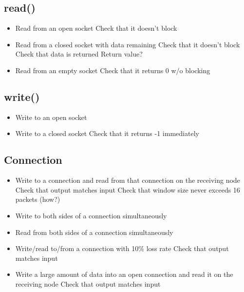 \documentclass[]{article}
\begin{document}
\subsection{read()}
\begin{itemize}
	\item Read from an open socket
	\subitem Check that it doesn't block
	\item Read from a closed socket with data remaining
	\subitem Check that it doesn't block
	\subitem Check that data is returned
	\subitem Return value?
	\item Read from an empty socket
	\subitem Check that it returns 0 w/o blocking
\end{itemize}
\subsection{write()}
\begin{itemize}
	\item Write to an open socket
	\item Write to a closed socket
	\subitem Check that it returns -1 immediately
\end{itemize}
\subsection{Connection}
\begin{itemize}
	\item Write to a connection and read from that connection on the receiving node
	\subitem Check that output matches input
	\subitem Check that window size never exceeds 16 packets (how?)
	\item Write to both sides of a connection simultaneously
	\item Read from both sides of a connection simultaneously
	\item Write/read to/from a connection with 10\% loss rate
	\subitem Check that output matches input
	\item Write a large amount of data into an open connection and read it on the receiving node
	\subitem Check that output matches input
\end{itemize}
\end{document}
